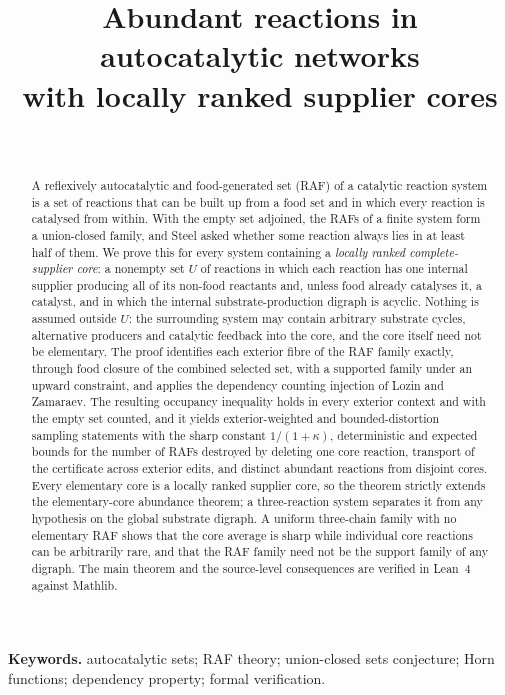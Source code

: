\documentclass[11pt,a4paper]{article}
\title{Abundant reactions in autocatalytic networks\\ with locally ranked supplier cores}
\author{\PaperAuthor\\[2pt] {\small\itshape \PaperAffiliation}}
\date{\PaperDate}
\theoremstyle{plain}
\theoremstyle{definition}
\theoremstyle{remark}
\begin{document}
\maketitle

\begin{abstract}
A reflexively autocatalytic and food-generated set (RAF) of a catalytic reaction system is a set of reactions that can be built up from a food set and in which every reaction is catalysed from within. With the empty set adjoined, the RAFs of a finite system form a union-closed family, and Steel asked whether some reaction always lies in at least half of them. We prove this for every system containing a \emph{locally ranked complete-supplier core}: a nonempty set $U$ of reactions in which each reaction has one internal supplier producing all of its non-food reactants and, unless food already catalyses it, a catalyst, and in which the internal substrate-production digraph is acyclic. Nothing is assumed outside $U$: the surrounding system may contain arbitrary substrate cycles, alternative producers and catalytic feedback into the core, and the core itself need not be elementary. The proof identifies each exterior fibre of the RAF family exactly, through food closure of the combined selected set, with a supported family under an upward constraint, and applies the dependency counting injection of Lozin and Zamaraev. The resulting occupancy inequality holds in every exterior context and with the empty set counted, and it yields exterior-weighted and bounded-distortion sampling statements with the sharp constant $1/(1+\kappa)$, deterministic and expected bounds for the number of RAFs destroyed by deleting one core reaction, transport of the certificate across exterior edits, and distinct abundant reactions from disjoint cores. Every elementary core is a locally ranked supplier core, so the theorem strictly extends the elementary-core abundance theorem; a three-reaction system separates it from any hypothesis on the global substrate digraph. A uniform three-chain family with no elementary RAF shows that the core average is sharp while individual core reactions can be arbitrarily rare, and that the RAF family need not be the support family of any digraph. The main theorem and the source-level consequences are verified in Lean~4 against Mathlib.
\end{abstract}

\noindent\textbf{Keywords.} autocatalytic sets; RAF theory; union-closed sets conjecture; Horn functions; dependency property; formal verification.
\end{document}
